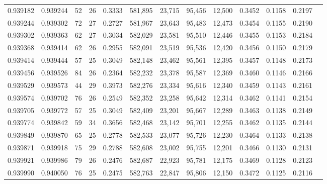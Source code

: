 \begin{tabular}{rrrrrrrrrrrrr}
0.939182 & 0.939244 &    52 &  26 &                                     0.3333 & 581,895 &  23,715 &  95,456 &  12,500 & 0.3452 & 0.1158 & 0.2197 \\
0.939244 & 0.939302 &    72 &  27 &                                     0.2727 & 581,967 &  23,643 &  95,483 &  12,473 & 0.3454 & 0.1155 & 0.2190 \\
0.939302 & 0.939363 &    62 &  27 &                                     0.3034 & 582,029 &  23,581 &  95,510 &  12,446 & 0.3455 & 0.1153 & 0.2184 \\
0.939368 & 0.939414 &    62 &  26 &                                     0.2955 & 582,091 &  23,519 &  95,536 &  12,420 & 0.3456 & 0.1150 & 0.2179 \\
0.939414 & 0.939444 &    57 &  25 &                                     0.3049 & 582,148 &  23,462 &  95,561 &  12,395 & 0.3457 & 0.1148 & 0.2173 \\
0.939456 & 0.939526 &    84 &  26 &                                     0.2364 & 582,232 &  23,378 &  95,587 &  12,369 & 0.3460 & 0.1146 & 0.2166 \\
0.939529 & 0.939573 &    44 &  29 &                                     0.3973 & 582,276 &  23,334 &  95,616 &  12,340 & 0.3459 & 0.1143 & 0.2161 \\
0.939574 & 0.939702 &    76 &  26 &                                     0.2549 & 582,352 &  23,258 &  95,642 &  12,314 & 0.3462 & 0.1141 & 0.2154 \\
0.939705 & 0.939772 &    57 &  25 &                                     0.3049 & 582,409 &  23,201 &  95,667 &  12,289 & 0.3463 & 0.1138 & 0.2149 \\
0.939774 & 0.939842 &    59 &  34 &                                     0.3656 & 582,468 &  23,142 &  95,701 &  12,255 & 0.3462 & 0.1135 & 0.2144 \\
0.939849 & 0.939870 &    65 &  25 &                                     0.2778 & 582,533 &  23,077 &  95,726 &  12,230 & 0.3464 & 0.1133 & 0.2138 \\
0.939871 & 0.939918 &    75 &  29 &                                     0.2788 & 582,608 &  23,002 &  95,755 &  12,201 & 0.3466 & 0.1130 & 0.2131 \\
0.939921 & 0.939986 &    79 &  26 &                                     0.2476 & 582,687 &  22,923 &  95,781 &  12,175 & 0.3469 & 0.1128 & 0.2123 \\
0.939990 & 0.940050 &    76 &  25 &                                     0.2475 & 582,763 &  22,847 &  95,806 &  12,150 & 0.3472 & 0.1125 & 0.2116 \\

\end{tabular}
